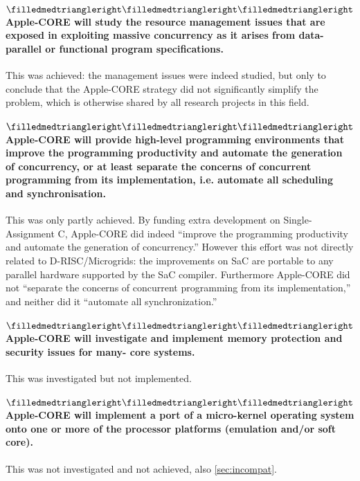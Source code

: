 \paragraph{
$\filledmedtriangleright\filledmedtriangleright\filledmedtriangleright$
Apple-CORE will study the resource management issues that are exposed in exploiting massive concurrency as it arises from data-parallel or functional program specifications.}
This was achieved: the management issues were indeed studied, but only
to conclude that the Apple-CORE strategy did not significantly
simplify the problem, which is otherwise shared by all research projects
in this field.



\paragraph{
$\filledmedtriangleright\filledmedtriangleright\filledmedtriangleright$
Apple-CORE will provide high-level programming environments that
improve the programming productivity and automate the generation of
concurrency, or at least separate the concerns of concurrent
programming from its implementation, i.e. automate all scheduling and
synchronisation.}  This was only partly achieved. By funding extra
development on Single-Assignment C, Apple-CORE did indeed ``improve
the programming productivity and automate the generation of
concurrency.'' However this effort was not directly related to
D-RISC/Microgrids: the improvements on SaC are portable to any
parallel hardware supported by the SaC compiler. Furthermore
Apple-CORE did not ``separate the concerns of concurrent programming
from its implementation,'' and neither did it ``automate all
synchronization.''

\paragraph{
$\filledmedtriangleright\filledmedtriangleright\filledmedtriangleright$
Apple-CORE will investigate and implement memory protection and security issues for many- core systems.}
This was investigated but not implemented.

\paragraph{
$\filledmedtriangleright\filledmedtriangleright\filledmedtriangleright$
Apple-CORE will implement a port of a micro-kernel operating system onto one or more of the processor platforms (emulation and/or soft core).}
This was not investigated and not achieved, \cf also \cref{sec:incompat}.

